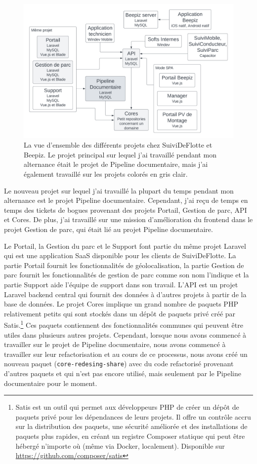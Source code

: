 \begin{figure}[ht]
    \centering
    \includegraphics[width=\textwidth]{img/present-architecture}
    \caption{La vue d'ensemble des différents projets chez SuiviDeFlotte et Beepiz. Le projet principal sur lequel j'ai travaillé pendant mon alternance était le projet de Pipeline documentaire, mais j'ai également travaillé sur les projets colorés en gris clair.}
    \label{fig:architecture}
\end{figure}

Le nouveau projet sur lequel j'ai travaillé la plupart du temps pendant mon alternance est le projet Pipeline documentaire. Cependant, j'ai reçu de temps en temps des tickets de bogues provenant des projets Portail, Gestion de parc, API et Cores. De plus, j'ai travaillé sur une mission d'amélioration du frontend dans le projet Gestion de parc, qui était lié au projet Pipeline documentaire.

Le Portail, la Gestion du parc et le Support font partie du même projet Laravel qui est une application SaaS disponible pour les clients de SuiviDeFlotte. La partie Portail fournit les fonctionnalités de géolocalisation, la partie Gestion de parc fournit les fonctionnalités de gestion de parc comme son nom l'indique et la partie Support aide l'équipe de support dans son travail. L'API est un projet Laravel backend central qui fournit des données à d'autres projets à partir de la base de données. Le projet Cores implique un grand nombre de paquets PHP relativement petits qui sont stockés dans un dépôt de paquets privé créé par Satis.\footnote{Satis est un outil qui permet aux développeurs PHP de créer un dépôt de paquets privé pour les dépendances de leurs projets. Il offre un contrôle accru sur la distribution des paquets, une sécurité améliorée et des installations de paquets plus rapides, en créant un registre Composer statique qui peut être hébergé n'importe où (même via Docker, localement). Disponible sur \url{https://github.com/composer/satis}} Ces paquets contiennent des fonctionnalités communes qui peuvent être utiles dans plusieurs autres projets. Cependant, lorsque nous avons commencé à travailler sur le projet de Pipeline documentaire, nous avons commencé à travailler sur leur refactorisation et au cours de ce processus, nous avons créé un nouveau paquet (\Verb|core-redesing-share|) avec du code refactorisé provenant d'autres paquets et qui n'est pas encore utilisé, mais seulement par le Pipeline documentaire pour le moment.